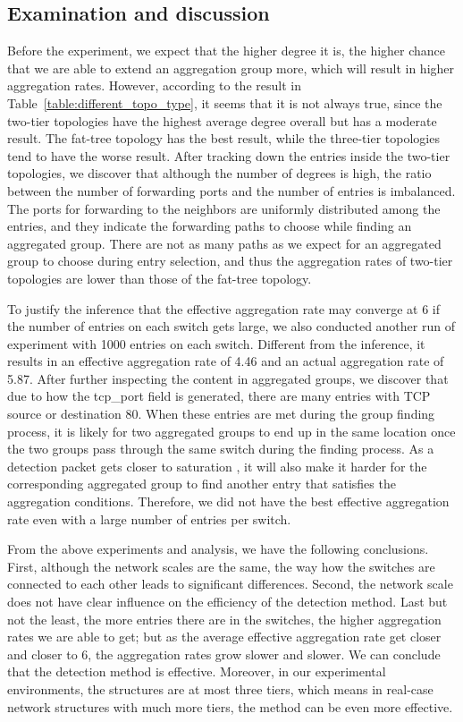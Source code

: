 \subsection{Examination and discussion}
\label{examination_and_discussion}

Before the experiment, we expect that the higher degree it is, the higher chance that we are able to extend an aggregation group more, which will result in higher aggregation rates. However, according to the result in Table~\ref{table:different_topo_type}, it seems that it is not always true, since the two-tier topologies have the highest average degree overall but has a moderate result. The fat-tree topology has the best result, while the three-tier topologies tend to have the worse result. After tracking down the entries inside the two-tier topologies, we discover that although the number of degrees is high, the ratio between the number of forwarding ports and the number of entries is imbalanced. The ports for forwarding to the neighbors are uniformly distributed among the entries, and they indicate the forwarding paths to choose while finding an aggregated group. There are not as many paths as we expect for an aggregated group to choose during entry selection, and thus the aggregation rates of two-tier topologies are lower than those of the fat-tree topology. 

To justify the inference that the effective aggregation rate may converge at 6 if the number of entries on each switch gets large, we also conducted another run of experiment with 1000 entries on each switch. Different from the inference, it results in an effective aggregation rate of 4.46 and an actual aggregation rate of 5.87. After further inspecting the content in aggregated groups, we discover that due to how the tcp\_port field is generated, there are many entries with TCP source or destination 80. When these entries are met during the group finding process, it is likely for two aggregated groups to end up in the same location once the two groups pass through the same switch during the finding process. As a detection packet gets closer to saturation \sout{}, it will also make it harder for the corresponding aggregated group to find another entry that satisfies the aggregation conditions. Therefore, we did not have the best effective aggregation rate even with a large number of entries per switch. 

From the above experiments and analysis, we have the following conclusions. First, although the network scales are the same, the way how the switches are connected to each other leads to significant differences. Second, the network scale does not have clear influence on the efficiency of the detection method. Last but not the least, the more entries there are in the switches, the higher aggregation rates we are able to get; but as the average effective aggregation rate get closer and closer to 6, the aggregation rates grow slower and slower. We can conclude that the detection method is effective. Moreover, in our experimental environments, the structures are at most three tiers, which means in real-case network structures with much more tiers, the method can be even more effective. 